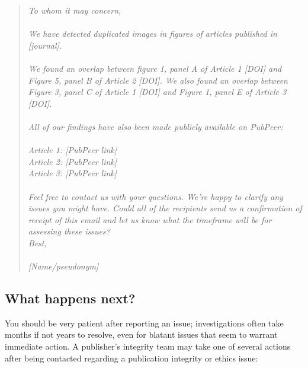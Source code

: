 \documentclass[letterpaper, 12pt]{article}
\begin{document}
\begin{quote}
\textit{To whom it may concern,}\\
\indent\\
\textit{We have detected duplicated images in figures of articles published in [journal].}\\
\indent\\
\textit{We found an overlap between figure 1, panel A of Article 1 [DOI] and Figure 5, panel B of Article 2 [DOI]. We also found an overlap between Figure 3, panel C of Article 1 [DOI] and Figure 1, panel E of Article 3 [DOI].}\\
\indent\\
\textit{All of our findings have also been made publicly available on PubPeer:}\\
\indent\\
\textit{Article 1: [PubPeer link]\\
Article 2: [PubPeer link]\\
Article 3: [PubPeer link]\\}
\indent\\
\textit{Feel free to contact us with your questions. We’re happy to clarify any issues you might have. Could all of the recipients send us a confirmation of receipt of this email and let us know what the timeframe will be for assessing these issues?}\\
\indent
\textit{Best,}\\
\indent\\
\textit{[Name/pseudonym]}
\end{quote}

\subsection*{What happens next?}

You should be very patient after reporting an issue; investigations often take months if not years to resolve, even for blatant issues that seem to warrant immediate action. A publisher's integrity team may take one of several actions after being contacted regarding a publication integrity or ethics issue:
\end{document}
